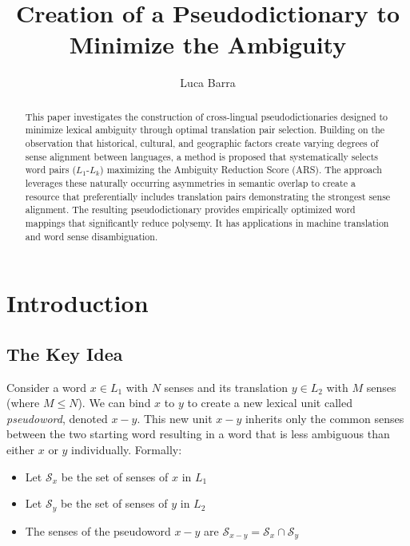 \documentclass[runningheads]{llncs}
\begin{document}
\title{Creation of a Pseudodictionary to Minimize the Ambiguity}

\graphicspath{{images/}}

\author{Luca Barra}



\maketitle

\begin{abstract}
This paper investigates the construction of cross-lingual pseudodictionaries designed to minimize lexical ambiguity through optimal translation pair selection. Building on the observation that historical, cultural, and geographic factors create varying degrees of sense alignment between languages, a method is proposed that systematically selects word pairs ($L_1$-$L_k$) maximizing the Ambiguity Reduction Score (ARS). The approach leverages these naturally occurring asymmetries in semantic overlap to create a resource that preferentially includes translation pairs demonstrating the strongest sense alignment. The resulting pseudodictionary provides empirically optimized word mappings that significantly reduce polysemy. It has applications in machine translation and word sense disambiguation.
\end{abstract}
\section{Introduction}

\subsection{The Key Idea}

Consider a word $x \in L_1$ with $N$ senses and its translation $y \in L_2$ with $M$ senses (where $M \leq N$). We can bind $x$ to $y$ to create a new lexical unit called \textit{pseudoword}, denoted $x-y$. This new unit $x-y$ inherits only the common senses between the two starting word resulting in a word that is less ambiguous than either $x$ or $y$ individually. Formally:

\begin{itemize}
  \item Let $\mathcal{S}_x$ be the set of senses of $x$ in $L_1$
  \item Let $\mathcal{S}_y$ be the set of senses of $y$ in $L_2$
  \item The senses of the pseudoword $x-y$ are $\mathcal{S}_{x-y} = \mathcal{S}_x \cap \mathcal{S}_y$
\end{itemize}
\end{document}
